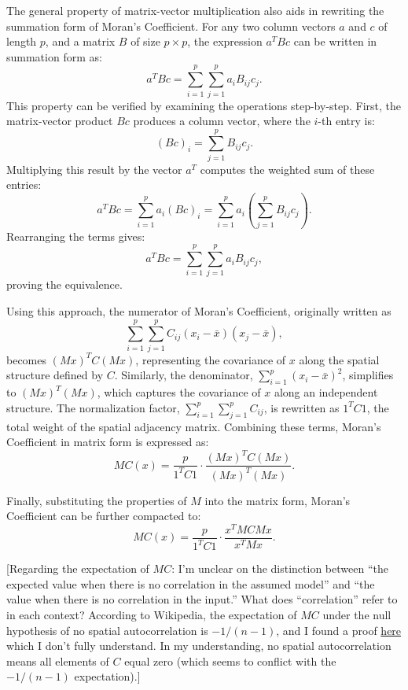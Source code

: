 \documentclass[12pt]{article}
\begin{document}
The general property of matrix-vector multiplication also aids in rewriting the summation form of Moran's Coefficient. For any two column vectors \( a \) and \( c \) of length \( p \), and a matrix \( B \) of size \( p \times p \), the expression \( a^T B c \) can be written in summation form as:
\[
  a^T B c = \sum_{i=1}^p \sum_{j=1}^p a_i B_{ij} c_j.
\]
This property can be verified by examining the operations step-by-step. First, the matrix-vector product \( Bc \) produces a column vector, where the \( i \)-th entry is:
\[
  (Bc)_i = \sum_{j=1}^p B_{ij} c_j.
\]
Multiplying this result by the vector \( a^T \) computes the weighted sum of these entries:
\[
  a^T B c = \sum_{i=1}^p a_i (Bc)_i = \sum_{i=1}^p a_i \left( \sum_{j=1}^p B_{ij} c_j \right).
\]
Rearranging the terms gives:
\[
  a^T B c = \sum_{i=1}^p \sum_{j=1}^p a_i B_{ij} c_j,
\]
proving the equivalence.

Using this approach, the numerator of Moran's Coefficient, originally written as 
\[
  \sum_{i=1}^p \sum_{j=1}^p C_{ij} (x_i - \bar{x})(x_j - \bar{x}),
\]
becomes \( (Mx)^T C (Mx) \), representing the covariance of \( x \) along the spatial structure defined by \( C \). Similarly, the denominator, \( \sum_{i=1}^p (x_i - \bar{x})^2 \), simplifies to \( (Mx)^T (Mx) \), which captures the covariance of \( x \) along an independent structure. The normalization factor, \( \sum_{i=1}^p \sum_{j=1}^p C_{ij} \), is rewritten as \( 1^T C 1 \), the total weight of the spatial adjacency matrix. Combining these terms, Moran’s Coefficient in matrix form is expressed as: 
\[
  MC(x) = \frac{p}{1^T C 1} \cdot \frac{(Mx)^T C (Mx)}{(Mx)^T (Mx)}.
\]

Finally, substituting the properties of \( M \) into the matrix form, Moran’s Coefficient can be further compacted to:
\[
  MC(x) = \frac{p}{1^T C 1} \cdot \frac{x^T M C M x}{x^T M x}.
\]



[Regarding the expectation of \( M C \): I'm unclear on the distinction between ``the expected value when there is no correlation in the assumed model'' and ``the value when there is no correlation in the input.'' What does ``correlation'' refer to in each context? According to Wikipedia, the expectation of \( M C \) under the null hypothesis of no spatial autocorrelation is \( -1 / (n - 1) \), and I found a proof \href{https://stats.stackexchange.com/questions/567411/expectation-and-variance-of-morans-i-under-the-null}{here} which I don’t fully understand. In my understanding, no spatial autocorrelation means all elements of \( C \) equal zero (which seems to conflict with the \( -1 / (n - 1) \) expectation).]
\end{document}
